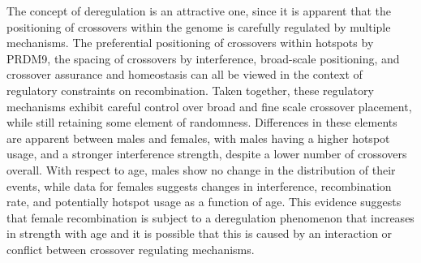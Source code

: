 The concept of deregulation is an attractive one, since it is apparent that the positioning of crossovers within the genome is carefully regulated by multiple mechanisms.
The preferential positioning of crossovers within hotspots by PRDM9, the spacing of crossovers by interference, broad-scale positioning, and crossover assurance and homeostasis can all be viewed in the context of regulatory constraints on recombination.
Taken together, these regulatory mechanisms exhibit careful control over broad and fine scale crossover placement, while still retaining some element of randomness.
Differences in these elements are apparent between males and females, with males having a higher hotspot usage, and a stronger interference strength, despite a lower number of crossovers overall.
With respect to age, males show no change in the distribution of their events, while data for females suggests changes in interference, recombination rate, and potentially hotspot usage as a function of age.
This evidence suggests that female recombination is subject to a deregulation phenomenon that increases in strength with age and
it is possible that this is caused by an interaction or conflict between crossover regulating mechanisms.


% 



% 

